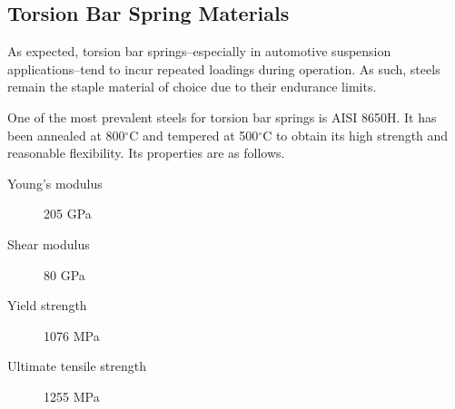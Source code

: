 \documentclass[
10pt,
a4paper,
openany,
svgnames,
]{book}
\begin{document}
\subsection{Torsion Bar Spring Materials}

As expected, torsion bar springs--especially in automotive suspension applications--tend to incur repeated loadings during operation. As such, steels remain the staple material of choice due to their endurance limits.

One of the most prevalent steels for torsion bar springs is AISI 8650H. It has been annealed at 800$^{\circ}$C and tempered at 500$^{\circ}$C to obtain its high strength and reasonable flexibility. Its properties are as follows.

\begin{description}
\item[Young's modulus] 205 GPa
\item[Shear modulus] 80 GPa
\item[Yield strength] 1076 MPa
\item[Ultimate tensile strength] 1255 MPa
\end{description}
\end{document}
